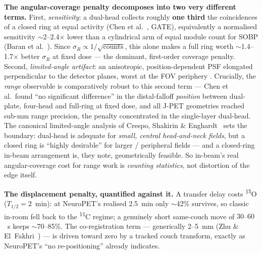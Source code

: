 \documentclass[11pt]{article}
\newcommand{\iso}[2]{\textsuperscript{#1}#2}
\begin{document}
\medskip
\noindent\textbf{The angular-coverage penalty decomposes into two very different
terms.} First, \emph{sensitivity}: a dual-head collects roughly \textbf{one third}
the coincidences of a closed ring at equal activity (Chen et al.~\cite{chen2013},
GATE), equivalently a normalised sensitivity $\sim$2--2.4$\times$ lower than a
cylindrical arm of equal module count for SOBP (Baran et al.~\cite{baran2023}).
Since $\sigma_R \propto 1/\sqrt{\mathrm{counts}}$, this alone makes a full ring
worth $\sim$1.4--1.7$\times$ better $\sigma_R$ at fixed dose --- the dominant,
first-order coverage penalty. Second, \emph{limited-angle artifact}: an
anisotropic, position-dependent PSF elongated perpendicular to the detector
planes, worst at the FOV periphery \cite{moglioni2022,chen2013}. Crucially, the
\emph{range} observable is comparatively robust to this second term --- Chen et
al.\ found ``no significant difference'' in the distal-falloff \emph{position}
between dual-plate, four-head and full-ring at fixed dose, and all J-PET
geometries reached sub-mm range precision, the penalty concentrated in the
single-layer dual-head. The canonical limited-angle analysis of Crespo, Shakirin
\& Enghardt~\cite{crespo2006} sets the boundary: dual-head is adequate for
\emph{small, central head-and-neck fields}, but a closed ring is ``highly
desirable'' for larger / peripheral fields --- and a closed-ring in-beam
arrangement is, they note, geometrically feasible. So in-beam's real
angular-coverage cost for range work is \emph{counting statistics}, not distortion
of the edge itself.

\medskip
\noindent\textbf{The displacement penalty, quantified against it.} A transfer
delay costs \iso{15}{O} ($T_{1/2}=2$~min): at NeuroPET's realised 2.5~min only
$\sim$42\% survives, so classic in-room fell back to the \iso{11}{C} regime; a
genuinely short same-couch move of $30$--$60$~s keeps $\sim$70--85\%. The
co-registration term --- generically 2--5~mm (Zhu \& El~Fakhri~\cite{zhuelfakhri2013})
--- is driven toward zero by a tracked couch transform, exactly as NeuroPET's ``no
re-positioning'' already indicates.
\end{document}
